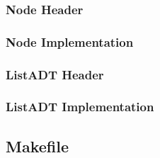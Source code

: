 \documentclass[10pt,letterpaper]{article}
\begin{document}
\noindent\hrulefill

\subsubsection*{Node Header}



\noindent\hrulefill

\subsubsection*{Node Implementation}



\noindent\hrulefill

\subsubsection*{ListADT Header}



\noindent\hrulefill

\subsubsection*{ListADT Implementation}



\noindent\hrulefill

\subsection*{Makefile}


\end{document}
